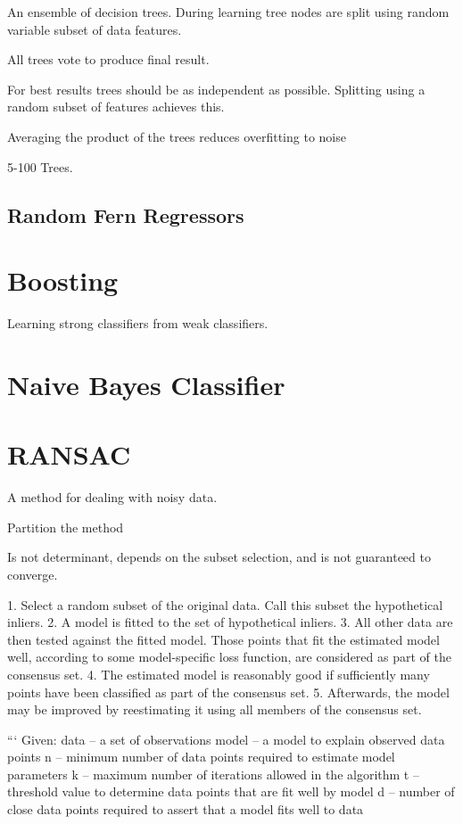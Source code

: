 An ensemble of decision trees. During learning tree nodes are split using random variable subset of data features.

All trees vote to produce final result.

For best results trees should be as independent as possible. Splitting using a random subset of features achieves this.

Averaging the product of the trees reduces overfitting to noise

5-100 Trees.

\subsection{Random Fern Regressors}


\section{Boosting}

Learning strong classifiers from weak classifiers.

\section{Naive Bayes Classifier}


\section{RANSAC}

A method for dealing with noisy data. 

Partition the method 

Is not determinant, depends on the subset selection, and is not guaranteed to converge.

1. Select a random subset of the original data. Call this subset the hypothetical inliers.
2. A model is fitted to the set of hypothetical inliers.
3. All other data are then tested against the fitted model. Those points that fit the estimated model well, according to some model-specific loss function, are considered as part of the consensus set.
4. The estimated model is reasonably good if sufficiently many points have been classified as part of the consensus set.
5. Afterwards, the model may be improved by reestimating it using all members of the consensus set.

```
Given:
    data – a set of observations
    model – a model to explain observed data points
    n – minimum number of data points required to estimate model parameters
    k – maximum number of iterations allowed in the algorithm
    t – threshold value to determine data points that are fit well by model 
    d – number of close data points required to assert that a model fits well to data


